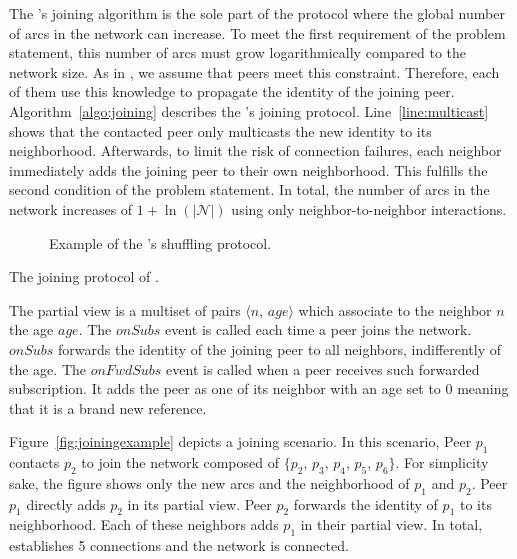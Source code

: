The \SPRAY's joining algorithm is the sole part of the protocol where the
global number of arcs in the network can increase. To meet the first
requirement of the problem statement, this number of arcs must grow
logarithmically compared to the network size. As in \SCAMP, we assume that
peers meet this constraint. Therefore, each of them use this knowledge to
propagate the identity of the joining peer. Algorithm~\ref{algo:joining}
describes the \SPRAY's joining protocol. Line~\ref{line:multicast} shows that
the contacted peer only multicasts the new identity to its
neighborhood. Afterwards, to limit the risk of connection failures, each
neighbor immediately adds the joining peer to their own neighborhood. This
fulfills the second condition of the problem statement.  In total, the number
of arcs in the network increases of $1+\ln(|\mathcal{N}|)$ using only
neighbor-to-neighbor interactions.

\begin{figure*}
  \centering
  \hspace{10pt}
  \hspace{10pt}
  \caption{\label{fig:cyclicexample}Example of the \SPRAY's shuffling
    protocol. }
\end{figure*}

\begin{algorithm}

\caption{\label{algo:joining}The joining protocol of \SPRAY.}
\end{algorithm}

The partial view is a multiset of pairs $\langle n,\, age\rangle$ which
associate to the neighbor $n$ the age $age$.  The $onSubs$ event is called each
time a peer joins the network. $onSubs$ forwards the identity of the joining
peer to all neighbors, indifferently of the age. The $onFwdSubs$ event is
called when a peer receives such forwarded subscription. It adds the peer as
one of its neighbor with an age set to $0$ meaning that it is a brand new
reference.

Figure~\ref{fig:joiningexample} depicts a joining scenario. In this scenario,
Peer $p_1$ contacts $p_2$ to join the network composed of $\{p_2$, $p_3$,
$p_4$, $p_5$, $p_6\}$. For simplicity sake, the figure shows only the new arcs
and the neighborhood of $p_1$ and $p_2$. Peer $p_1$ directly adds $p_2$ in its
partial view. Peer $p_2$ forwards the identity of $p_1$ to its
neighborhood. Each of these neighbors adds $p_1$ in their partial view. In
total, \SPRAY establishes 5 connections and the network is connected.

